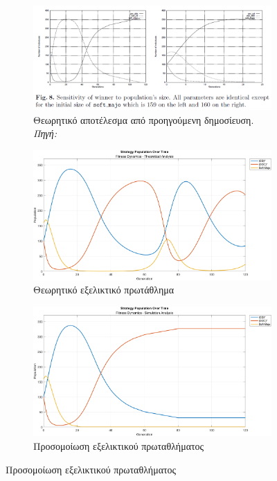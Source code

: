 \documentclass[12pt]{report}
\begin{document}
\begin{figure}[htbp]
    \centering

    \begin{subfigure}[b]{0.5\linewidth}
        \centering
        \includegraphics[width=\linewidth]{Figures Fitness Dynamics/8.png}
        \caption{Θεωρητικό αποτέλεσμα από προηγούμενη δημοσίευση. \textit{Πηγή:} \protect\cite{mathieu1999}}
        \label{fig:fig_fit_8_a}
    \end{subfigure}
    \hfill
    \begin{subfigure}[b]{0.5\linewidth}
        \centering
        \includegraphics[width=\linewidth]{Figures Fitness Dynamics/example8a.png}
        \caption{Θεωρητικό εξελικτικό πρωτάθλημα}
        \label{fig:fig_fit_8a_b}
    \end{subfigure}
    \hfill
    \begin{subfigure}[b]{0.5\linewidth}
        \centering
        \includegraphics[width=\linewidth]{Figures Fitness Dynamics/example8a-sim.png}
        \caption{Προσομοίωση εξελικτικού πρωταθλήματος}
        \label{fig:fig_fit_8a_c}
        

\end{subfigure}
\end{figure}
\end{document}
